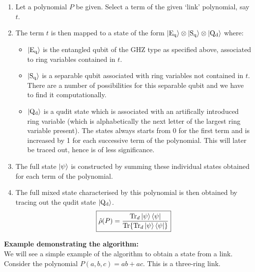 \documentclass{scrartcl}
\begin{document}
\begin{enumerate}
    \item Let a polynomial $P$ be given. Select a term of the given `link' polynomial, say $t$. 
    \item The term $t$ is then mapped to a state of the form $\ket{\mathrm{E_q}}\otimes\ket{\mathrm{S_q}}\otimes\ket{\mathrm{Q_d}}$ where: 
    \begin{itemize}
        \item $\ket{\mathrm{E_q}}$ is the entangled qubit of the GHZ type as specified above, associated to ring variables contained in $t$.
        \item $\ket{\mathrm{S_q}}$ is a separable qubit associated with ring variables not contained in $t$. There are a number of possibilities for this separable qubit and we have to find it computationally.
        \item $\ket{\mathrm{Q_d}}$ is a qudit state which is associated with an artifically introduced ring variable (which is alphabetically the next letter of the largest ring variable present). The states always starts from 0 for the first term and is increased by 1 for each successive term of the polynomial. This will later be traced out, hence is of less significance. 
    \end{itemize}
    \item The full state $\ket{\psi}$ is constructed by summing these individual states obtained for each term of the polynomial. 
    \item The full mixed state characterised by this polynomial is then obtained by tracing out the qudit state $\ket{\mathrm{Q_d}}$.
    $$\boxed{\hat{\rho}(P)=\frac{\Tr_d{\ket{\psi}\bra{\psi}}}{\Tr{\Tr_d{\ket{\psi}\bra{\psi}}}}}$$
\end{enumerate}
\textbf{Example demonstrating the algorithm:} \\[0.3cm]
We will see a simple example of the algorithm to obtain a state from a link. Consider the polynomial $P(a,b,c) = ab+ac$. This is a three-ring link. 
\end{document}
